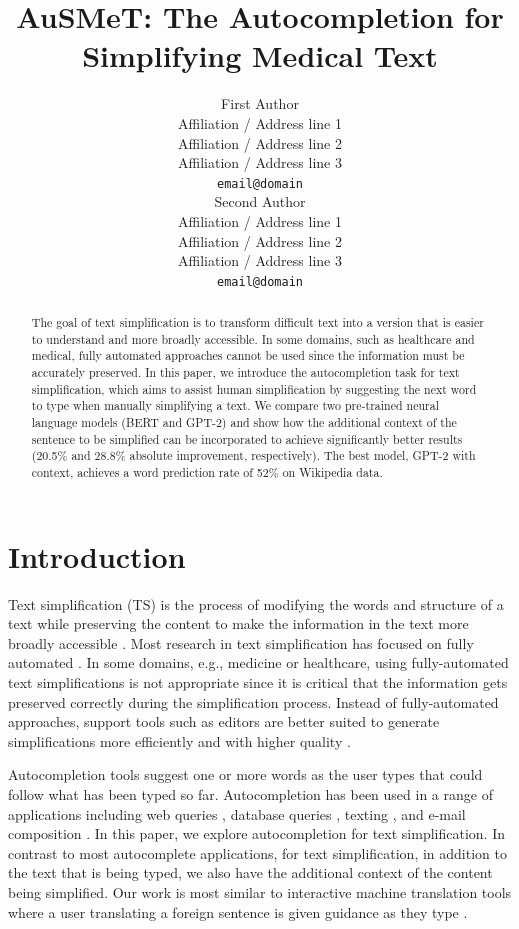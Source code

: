 \documentclass[11pt]{article}
\title{AuSMeT: The Autocompletion for Simplifying Medical Text}
\author{First Author \\
  Affiliation / Address line 1 \\
  Affiliation / Address line 2 \\
  Affiliation / Address line 3 \\
  {\tt email@domain} \\\And
  Second Author \\
  Affiliation / Address line 1 \\
  Affiliation / Address line 2 \\
  Affiliation / Address line 3 \\
  {\tt email@domain} \\}
\date{}
\begin{document}
\maketitle
\begin{abstract}
  The goal of text simplification is to transform difficult text into a version that is easier to understand and more broadly accessible.  In some domains, such as healthcare and medical, fully automated approaches cannot be used since the information must be accurately preserved.  In this paper, we introduce the autocompletion task for text simplification, which aims to assist human simplification by suggesting the next word to type when manually simplifying a text.  We compare two pre-trained neural language models (BERT and GPT-2) and show how the additional context of the sentence to be simplified can be incorporated to achieve significantly better results (20.5\% and 28.8\% absolute improvement, respectively).  The best model, GPT-2 with context, achieves a word prediction rate of 52\% on Wikipedia data.

\end{abstract}

\section{Introduction}

Text simplification (TS) is the process of modifying the words and structure of a text while preserving the content to make the information in the text more broadly accessible \cite{shardlow2014survey}.  Most research in text simplification has focused on fully automated \cite{zhu10,coster2011learning,xu2016optimizing, zhang2017sentence,nishihara2019controllable}.  In some domains, e.g., medicine or healthcare, using fully-automated text simplifications is not appropriate since it is critical that the information gets preserved correctly during the simplification process. Instead of fully-automated approaches, support tools such as editors are better suited to generate simplifications more efficiently and with higher quality \cite{kloehn2018jmir}.

Autocompletion tools suggest one or more words as the user types that could follow what has been typed so far.  Autocompletion has been used in a range of applications including web queries \cite{cai2016survey}, database queries \cite{khoussainova2010snipsuggest}, texting \cite{dunlop2000predictive}, and e-mail composition \cite{dai2019gmail}. In this paper, we explore autocompletion for text simplification.  In contrast to most autocomplete applications, for text simplification, in addition to the text that is being typed, we also have the additional context of the content being simplified.  Our work is most similar to interactive machine translation tools where a user translating a foreign sentence is given guidance as they type \cite{green-etal-2014-human}.
\end{document}
